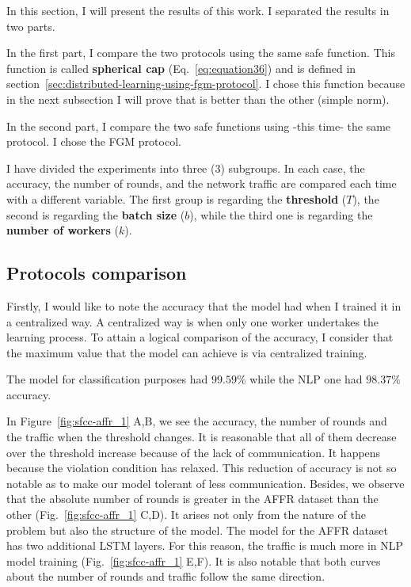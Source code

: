 In this section, I will present the results of this work.
I separated the results in two parts.

In the first part, I compare the two protocols using the same safe function.
This function is called \textbf{spherical cap} (Eq.~\ref{eq:equation36}) and is defined in section~\ref{sec:distributed-learning-using-fgm-protocol}.
I chose this function because in the next subsection I will prove that is better than the other (simple norm).

In the second part, I compare the two safe functions using -this time- the same protocol.
I chose the FGM protocol.

I have divided the experiments into three (3) subgroups.
In each case, the accuracy, the number of rounds, and the network traffic are compared each time with a different variable.
The first group is regarding the \textbf{threshold} ($T$), the second is regarding the \textbf{batch size} ($b$),
while the third one is regarding the \textbf{number of workers} ($k$).

\subsection{Protocols comparison}\label{subsec:protocols-comparison}

Firstly, I would like to note the accuracy that the model had when I trained it in a centralized way.
A centralized way is when only one worker undertakes the learning process.
To attain a logical comparison of the accuracy, I consider that the maximum value that the model can achieve is via centralized training.

The model for classification purposes had $99.59\%$ while the  NLP one had $98.37\%$ accuracy.

In Figure~\ref{fig:sfcc-affr_1} A,B, we see the accuracy, the number of rounds and the traffic when the threshold changes.
It is reasonable that all of them decrease over the threshold increase because of the lack of communication.
It happens because the violation condition has relaxed.
This reduction of accuracy is not so notable as to make our model tolerant of less communication.
Besides, we observe that the absolute number of rounds is greater in the AFFR dataset than the other (Fig.~\ref{fig:sfcc-affr_1} C,D).
It arises not only from the nature of the problem but also the structure of the model.
The model for the AFFR dataset has two additional LSTM layers.
For this reason, the traffic is much more in NLP model training (Fig.~\ref{fig:sfcc-affr_1} E,F).
It is also notable that both curves about the number of rounds and traffic follow the same direction.

